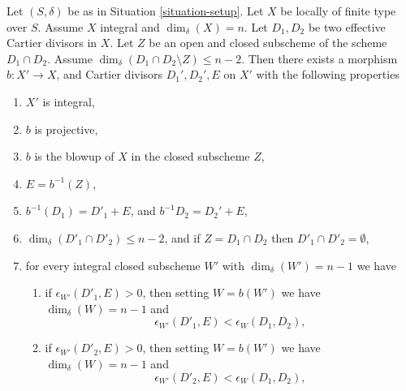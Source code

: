 \begin{lemma}
\label{lemma-two-divisors}
Let $(S, \delta)$ be as in Situation \ref{situation-setup}.
Let $X$ be locally of finite type over $S$.
Assume $X$ integral and $\dim_\delta(X) = n$.
Let $D_1, D_2$ be two effective Cartier divisors in $X$.
Let $Z$ be an open and closed subscheme of the scheme $D_1 \cap D_2$.
Assume $\dim_\delta(D_1 \cap D_2 \setminus Z) \leq n - 2$.
Then there exists a morphism
$b : X' \to X$, and Cartier divisors
$D_1', D_2', E$ on $X'$ with the following properties
\begin{enumerate}
\item $X'$ is integral,
\item $b$ is projective,
\item $b$ is the blowup of $X$ in the closed subscheme $Z$,
\item $E = b^{-1}(Z)$,
\item $b^{-1}(D_1) = D'_1 + E$, and $b^{-1}D_2 = D_2' + E$,
\item $\dim_\delta(D'_1 \cap D'_2) \leq n - 2$, and if
$Z = D_1 \cap D_2$ then $D'_1 \cap D'_2 = \emptyset$,
\item for every integral closed subscheme $W'$
with $\dim_\delta(W') = n - 1$ we have
\begin{enumerate}
\item if $\epsilon_{W'}(D'_1, E) > 0$, then setting
$W = b(W')$ we have
$\dim_\delta(W) = n - 1$ and
$$
\epsilon_{W'}(D'_1, E) < \epsilon_W(D_1, D_2),
$$
\item if $\epsilon_{W'}(D'_2, E) > 0$, then setting
$W = b(W')$ we have
$\dim_\delta(W) = n - 1$ and
$$
\epsilon_{W'}(D'_2, E) < \epsilon_W(D_1, D_2),
$$
\end{enumerate}
\end{enumerate}
\end{lemma}

